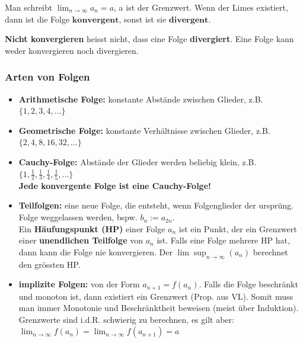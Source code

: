 \documentclass[8pt, a4paper, landscape, fleqn]{scrartcl}
\begin{document}
\begin{multicols*}{3}
			    Man schreibt $\lim_{n\to\infty} a_n = a$, a ist der Grenzwert. Wenn der Limes existiert, dann ist die Folge $\textbf{konvergent}$, sonst ist sie $\textbf{divergent}$.
			    
			    \textbf{Nicht konvergieren} heisst nicht, dass eine Folge \textbf{divergiert}. Eine Folge kann weder konvergieren noch divergieren.
			    \subsubsection{Arten von Folgen}
			        \begin{itemize}
			            \item \textbf{Arithmetische Folge:} konstante Abstände zwischen Glieder, z.B. $\{1,2,3,4,...\}$
			            \item \textbf{Geometrische Folge:} konstante Verhältnisse zwischen Glieder, z.B. $\{2,4,8,16,32,...\}$
			            \item \textbf{Cauchy-Folge:} Abstände der Glieder werden beliebig klein, z.B. $\{1, \frac{1}{2}, \frac{1}{3}, \frac{1}{4}, \frac{1}{5}, ...\}$\\
			            \textbf{Jede konvergente Folge ist eine Cauchy-Folge!}
			            \item \textbf{Teilfolgen:} eine neue Folge, die entsteht, wenn Folgenglieder der ursprüng. Folge weggelassen werden, bspw. $b_n := a_{2n}$.\\
			            Ein \textbf{Häufungspunkt (HP)} einer Folge $a_n$ ist ein Punkt, der ein Grenzwert einer \textbf{unendlichen Teilfolge} von $a_n$ ist. Falls eine Folge mehrere HP hat, dann kann die Folge nie konvergieren. Der $\lim \sup_{n\rightarrow \infty}(a_n)$ berechnet den grössten HP.
			            \item \textbf{implizite Folgen:} von der Form $a_{n+1} = f(a_n)$. Falls die Folge beschränkt und monoton ist, dann existiert ein Grenzwert (Prop. aus VL). Somit muss man immer Monotonie und Beschränktheit beweisen (meist über Induktion). Grenzwerte sind i.d.R. schwierig zu berechnen, es gilt aber:\\ $\lim_{n \rightarrow \infty} f(a_n) = \lim_{n \rightarrow \infty} f(a_{n+1}) = a$
			        \end{itemize}

\end{multicols*}
\end{document}
